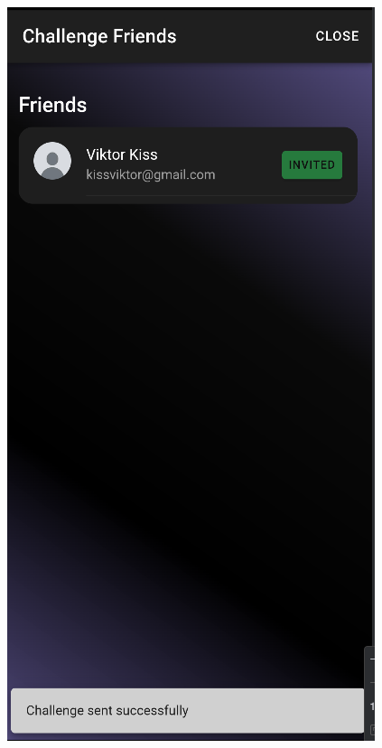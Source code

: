\documentclass[12pt]{report}
\begin{document}
\begin{figure}[H]
\begin{minipage}[b]{0.25\textwidth}
        \includegraphics[width=\linewidth]{src/challenge2.png}
    \end{minipage}

    \vspace{0.8em}


\end{figure}
\end{document}
